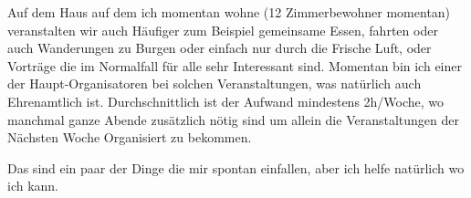 \documentclass{scrartcl}
\begin{document}
Auf dem Haus auf dem ich momentan wohne (12 Zimmerbewohner momentan) veranstalten wir auch Häufiger
zum Beispiel gemeinsame Essen, fahrten oder auch Wanderungen zu Burgen oder einfach nur durch die
Frische Luft, oder Vorträge die im Normalfall für alle sehr Interessant sind. Momentan bin ich einer
der Haupt-Organisatoren bei solchen Veranstaltungen, was natürlich auch Ehrenamtlich ist.
Durchschnittlich ist der Aufwand mindestens 2h/Woche, wo manchmal ganze Abende zusätzlich nötig sind
um allein die Veranstaltungen der Nächsten Woche Organisiert zu bekommen.


Das sind ein paar der Dinge die mir spontan einfallen, aber ich helfe natürlich wo ich kann.


\end{document}
